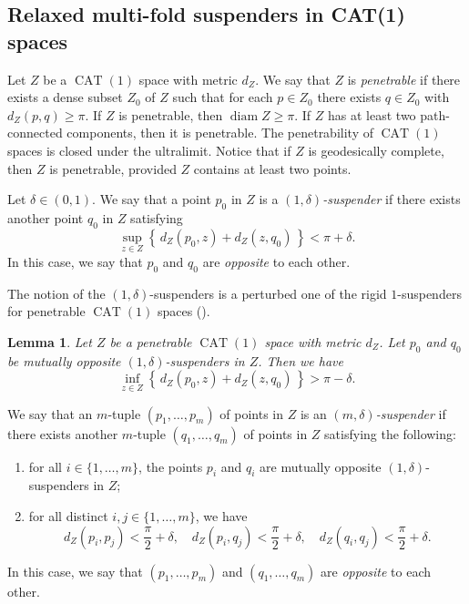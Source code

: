 \documentclass[a4paper,12pt]{amsart}
\newcommand{\CAT}{\operatorname{CAT}}
\newcommand{\diam}{\operatorname{diam}}
\numberwithin{equation}{section}
\theoremstyle{plain}
\newtheorem{lem}[thm]{Lemma}
\theoremstyle{definition}
\theoremstyle{remark}
\begin{document}
\subsection{Relaxed multi-fold suspenders in CAT(1) spaces}

Let $Z$ be a $\CAT(1)$ space with metric $d_Z$.
We say that $Z$ is 
\emph{penetrable}
if there exists a dense subset $Z_0$ of $Z$
such that for each $p \in Z_0$
there exists $q \in Z_0$ with $d_Z(p,q) \ge \pi$.
If $Z$ is penetrable, then $\diam Z \ge \pi$.
If $Z$ has at least two path-connected components,
then it is penetrable.
The penetrability of $\CAT(1)$ spaces is closed 
under the ultralimit.
Notice that if $Z$ is geodesically complete,
then $Z$ is penetrable,
provided $Z$ contains at least two points.

Let $\delta \in (0,1)$.
We say that 
a point $p_0$ in $Z$ is a \emph{$(1,\delta)$-suspender} 
if there exists another point $q_0$ in $Z$
satisfying
\begin{equation}
\sup_{z \in Z} \left\{ \, d_Z(p_0,z) + d_Z(z,q_0) \, \right\} < \pi + \delta.
\label{eqn: dsph}
\end{equation}
In this case,
we say that $p_0$ and $q_0$ are \emph{opposite} to each other.

The notion of the $(1,\delta)$-suspenders
is a perturbed one of the rigid $1$-suspenders
for penetrable $\CAT(1)$ spaces
(\cite[Lemma 4.1]{nagano6}).

\begin{lem}\label{lem: o1dsusp}
Let $Z$ be a penetrable $\CAT(1)$ space with metric $d_Z$.
Let $p_0$ and $q_0$ be mutually opposite 
$(1,\delta)$-suspenders in $Z$.
Then we have
\begin{equation}
\inf_{z \in Z} \left\{ \, d_Z(p_0,z) + d_Z(z,q_0) \, \right\} > \pi - \delta.
\label{eqn: o1dsuspa}
\end{equation}
\end{lem}

We say that an $m$-tuple $(p_1,\dots,p_m)$ of points in $Z$ is
an \emph{$(m,\delta)$-suspender} 
if there exists another $m$-tuple $(q_1,\dots,q_m)$ of points in $Z$
satisfying the following:
\begin{enumerate}
\item
for all $i \in \{ 1, \dots, m \}$,
the points $p_i$ and $q_i$ 
are mutually opposite $(1,\delta)$-suspenders in $Z$;
\item
for all distinct $i, j \in \{ 1, \dots, m \}$,
we have
\begin{equation}
d_Z(p_i,p_j) < \frac{\pi}{2} + \delta,
\quad
d_Z(p_i,q_j) < \frac{\pi}{2} + \delta,
\quad
d_Z(q_i,q_j) < \frac{\pi}{2} + \delta.
\label{eqn: dortho}
\end{equation}

\end{enumerate}
In this case, we say that $(p_1,\dots,p_m)$ and 
$(q_1,\dots,q_m)$ are \emph{opposite} to each other.
\end{document}
